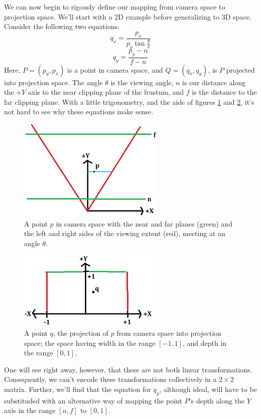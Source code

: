 \documentclass[12pt]{article}
\begin{document}
We can now begin to rigously define our mapping from camera space to projection space.  We'll start with a 2D example before generalizing to 3D space.  Consider the following two equations.
\begin{equation*}
q_x = \frac{p_x}{p_y\tan\frac{\theta}{2}}
\end{equation*}
\begin{equation*}
q_y = \frac{p_y-n}{f-n}
\end{equation*}
Here, $P=(p_y,p_x)$ is a point in camera space, and $Q=(q_x,q_y)$, is $P$ projected into projection space.
The angle $\theta$ is the viewing angle, $n$ is our distance along the $+Y$ axis to the near clipping plane of the frustum, and $f$ is the distance to the far clipping plane.  With a little trigonometry, and the aide of figures \ref{fig1} and \ref{fig2}, it's not hard to see why these equations make sense.
\begin{figure}
\centering
\includegraphics{fig1}
\caption{A point $p$ in camera space with the near and far planes (green) and the left and right sides of the viewing extent (red), meeting at an angle $\theta$.}
\label{fig1}
\end{figure}
\begin{figure}
\centering
\includegraphics{fig2}
\caption{A point $q$, the projection of $p$ from camera space into projection space; the space having width in the range $[-1,1]$, and depth in the range $[0,1]$.}
\label{fig2}
\end{figure}
One will see right away, however, that these are not both linear transformations.  Consequently, we can't encode these transformations collectively in a $2\times 2$ matrix.  Further, we'll find that the equation for $q_y$, although ideal, will have to be substituded with an alternative way of mapping the point $P$'s depth along the $Y$ axis in the range $[n,f]$ to $[0,1]$.
\end{document}
